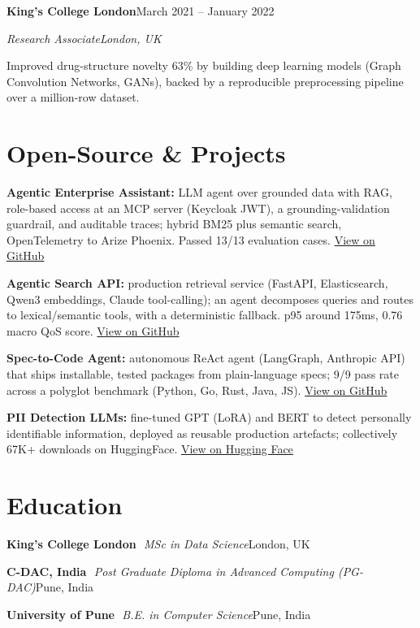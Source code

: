 \documentclass[10pt,a4paper]{article}
\newcommand{\entry}[4]{%
  {\color{company}\bfseries #1}\hfill {\color{muted}#2}\par
  \vspace{1pt}
  {\itshape #3}\hfill {\color{muted}\itshape #4}\par
  \vspace{3pt}%
}
\newcommand{\sep}{\,\textcolor{accent!60}{\textbar}\,}
\begin{document}
\entry{King's College London}{March 2021 -- January 2022}{Research Associate}{London, UK}
\begin{tight}
  \item Improved drug-structure novelty 63\% by building deep learning models (Graph Convolution Networks, GANs), backed by a reproducible preprocessing pipeline over a million-row dataset.
\end{tight}

\section{Open-Source \& Projects}
\begin{tight}
  \item \textbf{Agentic Enterprise Assistant:} LLM agent over grounded data with RAG, role-based access at an MCP server (Keycloak JWT), a grounding-validation guardrail, and auditable traces; hybrid BM25 plus semantic search, OpenTelemetry to Arize Phoenix. Passed 13/13 evaluation cases. \href{https://github.com/abhijeetscode/Agentic-Enterprise-Assistant}{View on GitHub}
  \item \textbf{Agentic Search API:} production retrieval service (FastAPI, Elasticsearch, Qwen3 embeddings, Claude tool-calling); an agent decomposes queries and routes to lexical/semantic tools, with a deterministic fallback. p95 around 175ms, 0.76 macro QoS score. \href{https://github.com/abhijeetscode/search-agent}{View on GitHub}
  \item \textbf{Spec-to-Code Agent:} autonomous ReAct agent (LangGraph, Anthropic API) that ships installable, tested packages from plain-language specs; 9/9 pass rate across a polyglot benchmark (Python, Go, Rust, Java, JS). \href{https://github.com/abhijeetscode/Spec-to-Code-Agent}{View on GitHub}
  \item \textbf{PII Detection LLMs:} fine-tuned GPT (LoRA) and BERT to detect personally identifiable information, deployed as reusable production artefacts; collectively 67K+ downloads on HuggingFace. \href{https://huggingface.co/ab-ai/pii_model}{View on Hugging Face}
\end{tight}

\section{Education}
{\color{company}\bfseries King's College London} \sep {\itshape MSc in Data Science}\hfill {\color{muted}London, UK}\par\vspace{1pt}
{\color{company}\bfseries C-DAC, India} \sep {\itshape Post Graduate Diploma in Advanced Computing (PG-DAC)}\hfill {\color{muted}Pune, India}\par\vspace{1pt}
{\color{company}\bfseries University of Pune} \sep {\itshape B.E. in Computer Science}\hfill {\color{muted}Pune, India}\par
\end{document}
